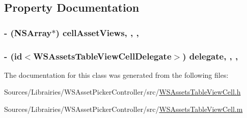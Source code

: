 \subsection{Property Documentation}
\hypertarget{interface_w_s_assets_table_view_cell_a41052ba948bdf8333384697615719d69}{
\subsubsection[{cell\-Asset\-Views}]{\setlength{\rightskip}{0pt plus 5cm}-\/ (N\-S\-Array$\ast$) cell\-Asset\-Views\hspace{0.3cm}{\ttfamily [read]}, {\ttfamily [write]}, {\ttfamily [nonatomic]}, {\ttfamily [strong]}}}\label{interface_w_s_assets_table_view_cell_a41052ba948bdf8333384697615719d69}
\hypertarget{interface_w_s_assets_table_view_cell_abba23424e61e11fea535a200b60ba78b}{
\subsubsection[{delegate}]{\setlength{\rightskip}{0pt plus 5cm}-\/ (id$<$W\-S\-Assets\-Table\-View\-Cell\-Delegate$>$) delegate\hspace{0.3cm}{\ttfamily [read]}, {\ttfamily [write]}, {\ttfamily [nonatomic]}, {\ttfamily [weak]}}}\label{interface_w_s_assets_table_view_cell_abba23424e61e11fea535a200b60ba78b}


The documentation for this class was generated from the following files\-:\begin{DoxyCompactItemize}
\item 
Sources/\-Librairies/\-W\-S\-Asset\-Picker\-Controller/src/\hyperlink{_w_s_assets_table_view_cell_8h}{W\-S\-Assets\-Table\-View\-Cell.\-h}\item 
Sources/\-Librairies/\-W\-S\-Asset\-Picker\-Controller/src/\hyperlink{_w_s_assets_table_view_cell_8m}{W\-S\-Assets\-Table\-View\-Cell.\-m}\end{DoxyCompactItemize}
